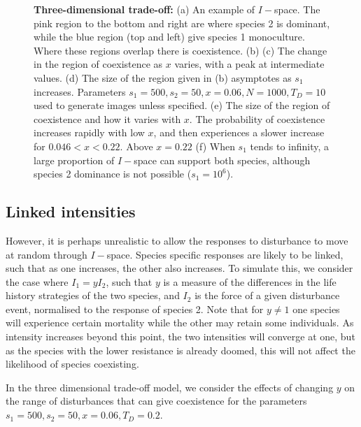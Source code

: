 \documentclass[preprint,10pt,reqno]{amsart}
\begin{document}
\begin{figure}[htbp]
\begin{tabular}{rrrr}
\end{tabular}
\caption{\textbf{Three-dimensional trade-off:} (a) An example of $I-$space. The pink region to the bottom and right are where species 2 is dominant, while the blue region (top and left) give species 1 monoculture. Where these regions overlap there is coexistence. (b)  (c) The change in the region of coexistence as $x$ varies, with a peak at intermediate values. (d) The size of the region given in (b) asymptotes as $s_1$ increases. Parameters $s_1=500,s_2=50,x=0.06,N=1000,T_D=10$ used to generate images unless specified. (e) The size of the region of coexistence and how it varies with $x$. The probability of coexistence increases rapidly with low $x$, and then experiences a slower increase for $0.046<x<0.22$. Above $x=0.22$ (f) When $s_1$ tends to infinity, a large proportion of $I-$space can support both species, although species 2 dominance is not possible ($s_1=10^6$).}
\label{full}
\end{figure}

\subsection{Linked intensities}
However, it is perhaps unrealistic to allow the responses to disturbance to move at random through $I-$space. Species specific responses are likely to be linked, such that as one increases, the other also increases. To simulate this, we consider the case where $I_1=yI_2$, such that $y$ is a measure of the differences in the life history strategies of the two species, and $I_2$ is the force of a given disturbance event, normalised to the response of species 2. Note that for $y\neq 1$ one species will experience certain mortality while the other may retain some individuals. As intensity increases beyond this point, the two intensities will converge at one, but as the species with the lower resistance is already doomed, this will not affect the likelihood of species coexisting.

In the three dimensional trade-off model, we consider the effects of changing $y$ on the range of disturbances that can give coexistence for the parameters $s_1=500,s_2=50,x=0.06,T_D=0.2$.
\end{document}
